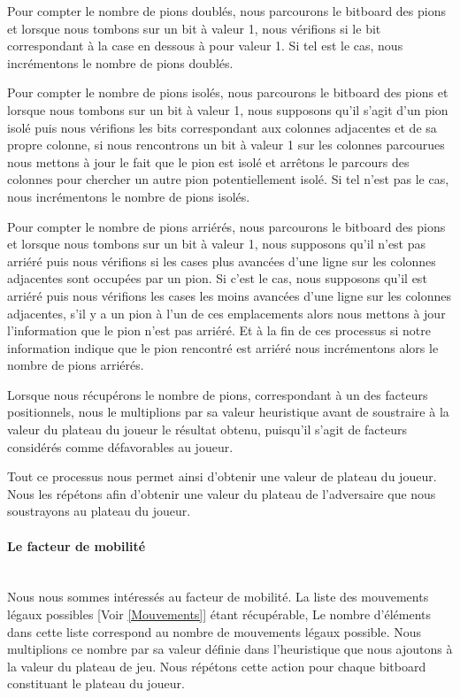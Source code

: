 \huge\documentclass{article}
\begin{document}
Pour compter le nombre de pions doublés, nous parcourons le bitboard des pions et lorsque nous tombons sur un bit à valeur 1, nous vérifions si le bit correspondant à la case en dessous à pour valeur 1.\newline
Si tel est le cas, nous incrémentons le nombre de pions doublés.\newline

Pour compter le nombre de pions isolés, nous parcourons le bitboard des pions et lorsque nous tombons sur un bit à valeur 1, nous supposons qu'il s'agit d'un pion isolé puis nous vérifions les bits correspondant aux colonnes adjacentes et de sa propre colonne, si nous rencontrons un bit à valeur 1 sur les colonnes parcourues nous mettons à jour le fait que le pion est isolé et arrêtons le parcours des colonnes pour chercher un autre pion potentiellement isolé. Si tel n'est pas le cas, nous incrémentons le nombre de pions isolés.\newline

Pour compter le nombre de pions arriérés, nous parcourons le bitboard des pions et lorsque nous tombons sur un bit à valeur 1, nous supposons qu'il n'est pas arriéré puis nous vérifions si les cases plus avancées d'une ligne sur les colonnes adjacentes sont occupées par un pion. Si c'est le cas, nous supposons qu'il est arriéré puis nous vérifions les cases les moins avancées d'une ligne sur les colonnes adjacentes, s'il y a un pion à l'un de ces emplacements alors nous mettons à jour l'information que le pion n'est pas arriéré. Et à la fin de ces processus si notre information indique que le pion rencontré est arriéré nous incrémentons alors le nombre de pions arriérés.

Lorsque nous récupérons le nombre de pions, correspondant à un des facteurs positionnels, nous le multiplions par sa valeur heuristique avant de soustraire à la valeur du plateau du joueur le résultat obtenu, puisqu'il s'agit de facteurs considérés comme défavorables au joueur.
\newline

Tout ce processus nous permet ainsi d'obtenir une valeur de plateau du joueur. Nous les répétons afin d'obtenir une valeur du plateau de l'adversaire que nous soustrayons au plateau du joueur.

\paragraph{Le facteur de mobilité}
~~\\
\newline
Nous nous sommes intéressés au facteur de mobilité.\newline
La liste des mouvements légaux possibles [Voir \ref{Mouvements}] étant récupérable,
Le nombre d'éléments dans cette liste correspond au nombre de mouvements légaux possible.
Nous multiplions ce nombre par sa valeur définie dans l'heuristique que nous ajoutons à la valeur du plateau de jeu.\newline
Nous répétons cette action pour chaque bitboard constituant le plateau du joueur.
\end{document}
